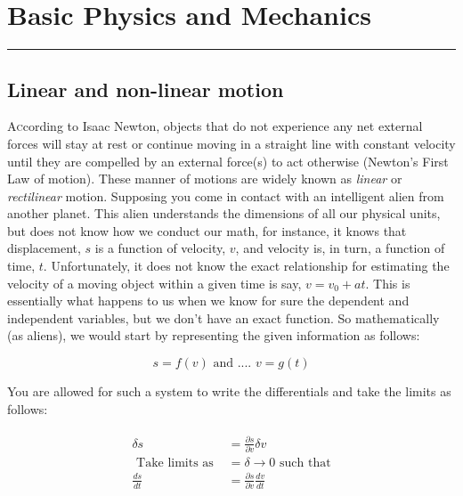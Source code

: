 
\chapter{Basic Physics and Mechanics}

\noindent\hspace*{\fill}\rule{\textwidth}{2pt}\vspace*{-\baselineskip}\vspace*{2pt} %
\section{Linear and non-linear motion}
\label{sandv}

\noindent \lettrine{A}ccording to Isaac Newton, objects that do not experience any net external forces will stay at rest or continue moving in a straight line with constant velocity until they are compelled by an external force(s) to act otherwise (Newton's First Law of motion). These manner of motions are widely known as \emph{linear} or \emph{rectilinear} motion. 
\noindent Supposing you come in contact with an intelligent alien from another planet. This alien understands the dimensions of all our physical units, but does not know how we conduct our math, for instance, it knows that displacement, $s$ is a function of velocity, $v$, and velocity is, in turn, a function of time, $t$. Unfortunately, it does not know the exact relationship for estimating the velocity of a moving object within a given time is say, $v = v_0+at$. This is essentially what happens to us when we know for sure the dependent and independent variables, but we don't have an exact function. So mathematically (as aliens), we would start by representing the given information as follows:

\begin{equation}
s = f\left( v \right) \text{ and .... }
v = g(t)
\label{eqn2.1}
\end{equation}

\noindent You are allowed for such a system to write the differentials and take the limits as follows:  

\begin{eqnarray}
\begin{split}
\delta s &= \frac{\partial s}{\partial v}\delta v \\
\text{ Take limits as } &=\delta \rightarrow 0 \text{ such that} \\
\frac{ds}{dt} & = \frac{\partial s}{\partial v}\frac{dv}{dt}
\end{split}
\label{eqn2.101}  
\end{eqnarray}

